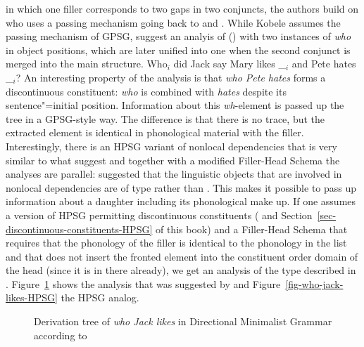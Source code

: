 in which one filler corresponds to two gaps in two conjuncts, the authors build on \citet{Kobele2008a}
who uses a \slasch passing mechanism going back to \citet{Sag83a-u} and \citet{Gazdar81a}. While
Kobele assumes the \slasch passing mechanism of GPSG, \citet{TS2016a} suggest an analyis of
() with two instances of \emph{who} in object positions, which are later unified into one when the second conjunct is merged
into the main structure. 
\ea
Who$_i$ did Jack say Mary likes \_$_i$ and Pete hates \_$_i$?
\z  
An interesting property of the analysis is that \emph{who Pete hates} forms a discontinuous
constituent: \emph{who} is combined with \emph{hates} despite its sentence"=initial
position. Information about this \emph{wh}-element is passed up the tree in a GPSG-style way. The
difference is that there is no trace, but the extracted element is identical in phonological material
with the filler. Interestingly, there is an HPSG variant of nonlocal dependencies that is very
similar to what \citet{TS2016a} suggest and together with a modified Filler-Head Schema the analyses
are parallel: \citet{HN94b} suggested that the linguistic objects that are involved in nonlocal
dependencies are of type  rather than . This makes it possible to pass up
information about a daughter including its phonological make up. If one assumes a version of HPSG
permitting discontinuous constituents (\citealp{Reape94a,Kathol2001a,Mueller95c,Mueller2004b} and
Section~\ref{sec-discontinuous-constituents-HPSG} of this book) and a Filler-Head Schema that requires that the phonology of the filler is identical to the phonology in the
\slasch list and that does not insert the fronted element into the constituent order domain of the
head (since it is in there already), we get an analysis of the type described in
\citet{TS2016a}. Figure~\ref{fig-who-jack-likes-DMG} shows the analysis that was suggested by
\citet{TS2016a} and Figure~\ref{fig-who-jack-likes-HPSG} the HPSG analog.
\begin{figure}
\caption{Derivation tree of \emph{who Jack likes} in Directional Minimalist Grammar according to \citet{TS2016a}}\label{fig-who-jack-likes-DMG}
\end{figure}
